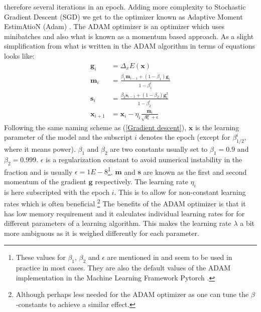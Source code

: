 therefore several iterations in an epoch.
Adding more complexity to Stochastic Gradient Descent (SGD) we get to the optimizer 
known as Adaptive Moment EstimAtioN (Adam) \citep{adam}. The ADAM optimizer is 
an optimizer which uses minibatches and also what is known as a momentum based approach.
As a slight simplification from what is written in \citet{fysstkweek40} the ADAM 
algorithm in terms of equations looks like:
\begin{align}
    \mathbf{g}_i &= \Delta_x E(\bm{x}) \label{ADAM.1} \\
    \bm{m}_i &= \frac{\beta_1 \bm{m}_{i-1} + (1 - \beta_1)\bm{g}_i}{1 - \beta_1^i} \\
    \bm{s}_i &= \frac{\beta_2 \bm{s}_{i-1} + (1-\beta_2)\bm{g}^2_i}{1 - \beta_2^i} \\
    \bm{x}_{i+1} &= \bm{x}_i - \eta_i \frac{\bm{m}_i}{\sqrt{\bm{s}_i}+ \epsilon} \label{ADAM.4}
\end{align}
Following the same naming scheme as (\ref{Gradient descent}), $\bm{x}$ is the 
learning parameter of the model and the subscript $i$ denotes the epoch (except 
for $\beta_{1/2}^i$, where it means power). 
$\beta_1$ and $\beta_2$ are two constants usually set to $\beta_1 = 0.9$ and 
$\beta_2 = 0.999$. $\epsilon$ is a regularization constant to avoid numerical 
instability in the fraction and is usually $\epsilon=1E-8$\footnote{These values 
for $\beta_1$, $\beta_2$ and $\epsilon$ are mentioned in \citet{adam} and seem 
to be used in practice in most cases. They are also the default values of the 
ADAM implementation in the Machine Learning Framework Pytorch \citep{NEURIPS2019_9015}.}.
$\bm{m}$ and $\bm{s}$ are known as the first and second momentum of the gradient 
$\bm{g}$ respectively. The learning rate $\eta_i$\\ is here subscripted with the 
epoch $i$. This is to allow for non-constant learning rates which is often beneficial 
\footnote{Although perhaps less needed for the ADAM optimizer as one can tune the 
$\beta$-constants to achieve a similar effect.}
The benefits of the ADAM optimizer is that it has low memory requirement and it calculates 
individual learning rates for for different parameters of a learning algorithm. 
This makes the learning rate $\lambda$ a bit more ambiguous as it is weighed 
differently for each parameter.
